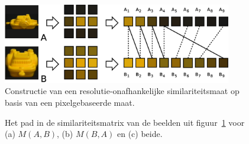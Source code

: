 
\begin{figure}[tbp]
\begin{center}
\includegraphics[width=10cm]{images/multires.eps}
\caption{\label{fig:multires}Constructie van een resolutie-onafhankelijke similariteitsmaat op basis van een pixelgebaseerde maat.}
\end{center}
\end{figure}

\begin{figure}[tbp]
\begin{center}
\caption{\label{fig:multires_sim-matrices}Het pad in de similariteitsmatrix van de beelden uit 
figuur~\ref{fig:multires} voor (a) $M(A,B)$, (b) $M(B,A)$ en (c) beide.}
\end{center}
\end{figure}

